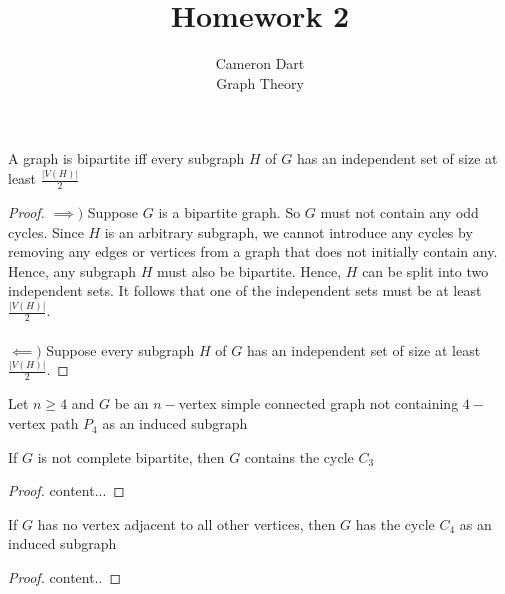 \documentclass{article}
\newenvironment{claim}[2][Claim]{\begin{trivlist}
		\item[\hskip \labelsep {\bfseries #1}\hskip \labelsep {\bfseries #2}]}{\end{trivlist}}
\begin{document}
\title{Homework 2} %
\author{Cameron Dart\\ Graph Theory} %

\maketitle

\begin{claim}{1}
	A graph is bipartite iff every subgraph $H$ of $G$ has an independent set of size at least $\frac{|V(H)|}{2}$
\end{claim}

\begin{proof}
	$\implies )$ Suppose $G$ is a bipartite graph.  So $G$ must not contain any odd cycles. Since $H$ is an arbitrary subgraph, we cannot introduce any cycles by removing any edges or vertices from a graph that does not initially contain any. Hence, any subgraph $H$ must also be bipartite. Hence, $H$ can be split into two independent sets. It follows that one of the independent sets must be at least $\frac{|V(H)|}{2}$.\\ \\
	$\impliedby)$ Suppose every subgraph $H$ of $G$ has an independent set of size at least$\frac{|V(H)|}{2}$.
	\end{proof}

Let $n \geq 4$ and $G$ be an $n-$vertex simple connected graph not containing $4-$vertex path $P_4$ as an induced subgraph 
\begin{claim}{2.a}
	If $G$ is not complete bipartite, then $G$ contains the cycle $C_3$
\end{claim}

\begin{proof}
	content...
\end{proof}

\begin{claim}{2.b}
	If $G$ has no vertex adjacent to all other vertices, then $G$ has the cycle $C_4$ as an induced subgraph
\end{claim}
\begin{proof}
	content..
\end{proof}
\end{document}
